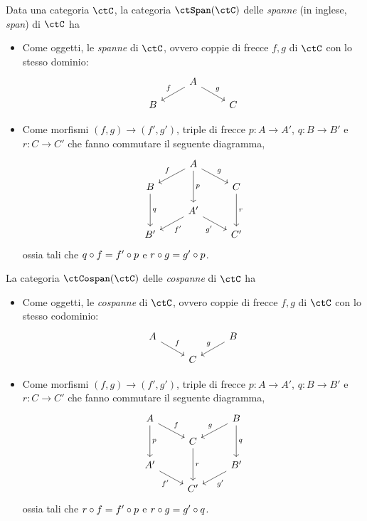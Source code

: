 \begin{definition}\label{def_span_e_cospan}
	Data una categoria \(\ctC\), la categoria \(\ctSpan(\ctC)\) delle \emph{spanne} (in inglese, \emph{span}) di \(\ctC\) ha
	\begin{itemize}
		\item Come oggetti, le \emph{spanne} di \(\ctC\), ovvero coppie di frecce \(f,g\) di \(\ctC\) con lo stesso dominio:
		      \[
			      \begin{tikzcd}[row sep=small]
				      & A \ar{dl}[swap]{f} \ar{dr}{g} \\
				      B && C
			      \end{tikzcd}
		      \]
		\item Come morfismi \((f,g)\to (f',g')\), triple di frecce \(p:A\to A'\), \(q:B\to B'\) e \(r:C\to C'\) che fanno commutare il seguente diagramma,
		      \begin{equation}
			      \begin{tikzcd}[row sep=small]
				      & A \ar{dd}{p} \ar{dl}[swap]{f} \ar{dr}{g} \\
				      B \ar{dd}{q} && C \ar{dd}{r} \\
				      & A' \ar{dl}{f'} \ar{dr}[swap]{g'} \\
				      B' && C'
			      \end{tikzcd}
			      \label{mor_spanne}
		      \end{equation}
		      ossia tali che \(q\circ f=f'\circ p\) e \(r\circ g=g'\circ p\).
	\end{itemize}

	La categoria \(\ctCospan(\ctC)\) delle \emph{cospanne} di \(\ctC\) ha
	\begin{itemize}
		\item Come oggetti, le \emph{cospanne} di \(\ctC\), ovvero coppie di frecce \(f,g\) di \(\ctC\) con lo stesso codominio:
		      \[
			      \begin{tikzcd}[row sep=small]
				      A \ar{dr}{f} && B \ar{dl}[swap]{g} \\
				      & C
			      \end{tikzcd}
		      \]
		\item Come morfismi \((f,g)\to (f',g')\), triple di frecce \(p:A\to A'\), \(q:B\to B'\) e \(r:C\to C'\) che fanno commutare il seguente diagramma,
		      \[
			      \begin{tikzcd}[row sep=small]
				      A \ar{dd}{p} \ar{dr}{f} && B \ar{dd}{q} \ar{dl}[swap]{g} \\
				      & C \ar{dd}{r} \\
				      A' \ar{dr}[swap]{f'} && B' \ar{dl}{g'} \\
				      & C'
			      \end{tikzcd}
		      \]
		      ossia tali che \(r\circ f=f'\circ p\) e \(r\circ g=g'\circ q\).
	\end{itemize}
\end{definition}
